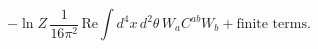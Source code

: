 \begin{equation}\label{Exact_Result}
- \ln Z\,\frac{1}{16\pi^2}\,
\mbox{Re}\int d^4x\,d^2\theta\,W_a C^{ab} W_b +\mbox{finite terms}.
\end{equation}

